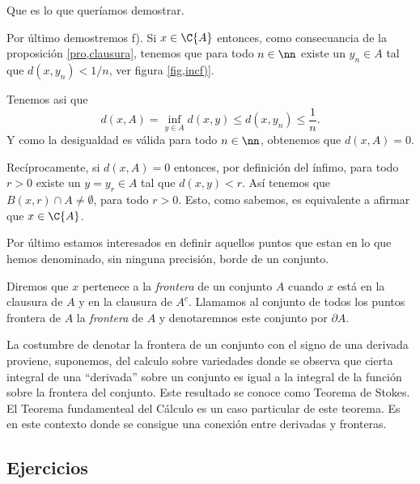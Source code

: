 \begin{demo}
Que es lo que queríamos demostrar.

Por último demostremos f). Si $x\in \C{A}$ entonces, como
consecuancia de la proposición \vref{pro,clausura}, tenemos que
para todo $n\in\nn$ existe un $y_n\in A$ tal que $d(x,y_n)<1/n$,
ver figura \vref{fig,incf)}.


Tenemos asi que
\[d(x,A)=\inf\limits_{y\in A}d(x,y)\leq d(x,y_n)\leq \frac1n.\]
Y como la desigualdad es válida para todo $n\in\nn$, obtenemos
que $d(x,A)=0$.

Recíprocamente, si $d(x,A)=0$ entonces, por definición del
ínfimo, para todo $r>0$ existe un $y=y_r\in A$ tal que
$d(x,y)<r$. Así tenemos que $B(x,r)\cap A\neq \emptyset$,
para todo $r>0$. Esto, como sabemos, es equivalente a afirmar que
$x\in \C{A}$.
\end{demo}

Por último estamos interesados en definir aquellos puntos que
estan en lo que hemos denominado, sin ninguna precisión, borde
de un conjunto.

\begin{definicion}{} Diremos que $x$ pertenece a la \emph{frontera} de un
conjunto $A$ cuando $x$ está en la clausura de $A$ y en la
clausura de $A^c$. Llamamos al conjunto de todos los puntos
frontera de $A$ la \emph{frontera }de $A$ y denotaremnos este
conjunto por $\partial A$. \end{definicion}


La costumbre de denotar la frontera de un conjunto con el signo de
una derivada proviene, suponemos, del calculo sobre variedades
donde se observa que cierta integral de una ``derivada'' sobre un
conjunto es igual a la integral de la función sobre la frontera
del conjunto. Este resultado se conoce como Teorema de Stokes. El
Teorema fundamenteal del Cálculo es un caso particular de este
teorema. Es en este contexto donde se consigue una conexión
entre derivadas y fronteras.






\subsection{Ejercicios}

